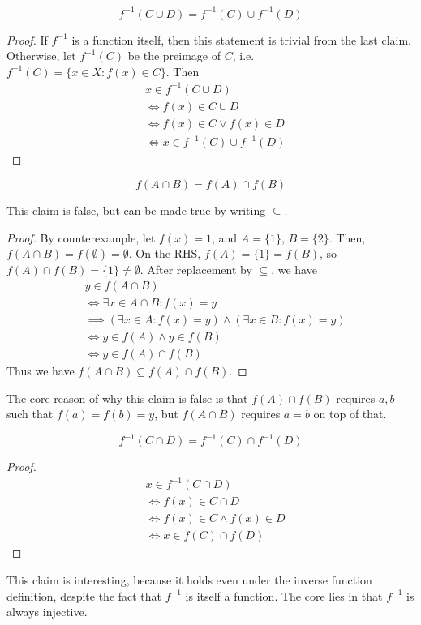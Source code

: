 \documentclass[12pt]{article}
\begin{document}
\begin{claim*}[ii]
    \[
    f^{-1}(C \cup D) = f^{-1}(C) \cup f^{-1}(D)
    \]
\end{claim*}
\begin{proof}
    If $f^{-1}$ is a function itself,
    then this statement is trivial from the last claim.
    Otherwise, let $f^{-1}(C)$ be the preimage of $C$, i.e.
    $f^{-1}(C) = \{x \in X : f(x) \in C\}$. Then
    \begin{align*}
        &x \in f^{-1}(C \cup D)\\
        &\iff f(x) \in C \cup D\\
        &\iff f(x) \in C \lor f(x) \in D\\
        &\iff x \in f^{-1}(C) \cup f^{-1}(D)
    \end{align*}
\end{proof}

\begin{claim*}[iii]
    \[
    f(A \cap B) = f(A) \cap f(B)
    \]
\end{claim*}

This claim is false, but can be made true
by writing $\subseteq$.

\begin{proof}
    By counterexample,
    let $f(x) = 1$, and $A = \{1\}$, $B = \{2\}$.
    Then, $f(A \cap B) = f(\emptyset) = \emptyset$.
    On the RHS, $f(A) = \{1\} = f(B)$, so $f(A) \cap f(B) = \{1\} \ne \emptyset$.
    After replacement by $\subseteq$, we have
    \begin{align*}
        &y \in f(A \cap B)\\
        &\iff \exists x \in A \cap B : f(x) = y\\
        &\implies (\exists x \in A : f(x) = y) \land (\exists x \in B : f(x) = y)\\
        &\iff y \in f(A) \land y \in f(B)\\
        &\iff y \in f(A) \cap f(B)
    \end{align*}
    Thus we have $f(A \cap B) \subseteq f(A) \cap f(B)$.
\end{proof}
The core reason of why this claim is false is that
$f(A) \cap f(B)$ requires $a,b$ such that $f(a) = f(b) = y$,
but $f(A \cap B)$ requires $a = b$ on top of that.

\begin{claim*}[iv]
    \[
    f^{-1}(C \cap D) = f^{-1}(C) \cap f^{-1}(D)
    \]
\end{claim*}
\begin{proof}
    \begin{align*}
        &x \in f^{-1}(C \cap D)\\
        &\iff f(x) \in C \cap D\\
        &\iff f(x) \in C \land f(x) \in D\\
        &\iff x \in f(C) \cap f(D)
    \end{align*}
\end{proof}
This claim is interesting, because it holds
even under the inverse function definition,
despite the fact that $f^{-1}$ is itself a function.
The core lies in that $f^{-1}$ is always injective.
\end{document}
